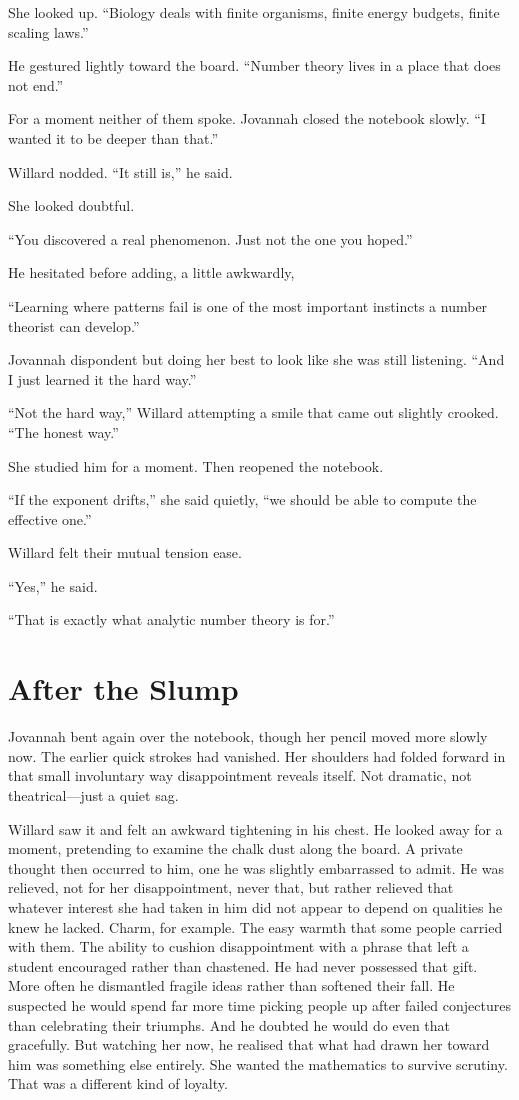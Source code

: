 She looked up. ``Biology deals with finite organisms, finite energy budgets, finite scaling laws.''

He gestured lightly toward the board. ``Number theory lives in a place that does not end.''

For a moment neither of them spoke. Jovannah closed the notebook slowly. ``I wanted it to be deeper than that.''

Willard nodded. ``It still is,'' he said.

She looked doubtful.

``You discovered a real phenomenon. Just not the one you hoped.''

He hesitated before adding, a little awkwardly,

``Learning where patterns fail is one of the most important instincts a number theorist can develop.''

Jovannah dispondent but doing her best to look like she was still listening. ``And I just learned it the hard way.''

``Not the hard way,'' Willard attempting a smile that came out slightly crooked. ``The honest way.''

She studied him for a moment. Then reopened the notebook.

``If the exponent drifts,'' she said quietly, ``we should be able to compute the effective one.''

Willard felt their mutual tension ease.

``Yes,'' he said.

``That is exactly what analytic number theory is for.''

\section*{After the Slump}

Jovannah bent again over the notebook, though her pencil moved more slowly now. The earlier quick strokes had vanished. Her shoulders had folded forward in that small involuntary way disappointment reveals itself. Not dramatic, not theatrical---just a quiet sag.

Willard saw it and felt an awkward tightening in his chest. He looked away for a moment, pretending to examine the chalk dust along the board. A private thought then occurred to him, one he was slightly embarrassed to admit. He was relieved, not for her disappointment, never that, but rather relieved that whatever interest she had taken in him did not appear to depend on qualities he knew he lacked. Charm, for example. The easy warmth that some people carried with them. The ability to cushion disappointment with a phrase that left a student encouraged rather than chastened. He had never possessed that gift. More often he dismantled fragile ideas rather than softened their fall. He suspected he would spend far more time picking people up after failed conjectures than celebrating their triumphs. And he doubted he would do even that gracefully. But watching her now, he realised that what had drawn her toward him was something else entirely. She wanted the mathematics to survive scrutiny. That was a different kind of loyalty.

